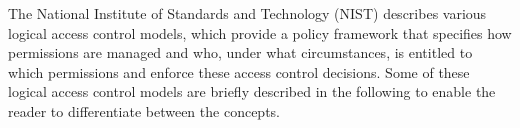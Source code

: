     The National Institute of Standards and Technology (NIST) \cite{Hu13guideto} describes various logical access control models, which provide a policy framework that specifies how permissions are managed and who, under what circumstances, is entitled to which permissions and enforce these access control decisions. Some of these logical access control models are briefly described in the following to enable the reader to differentiate between the concepts.
    \iffalse There is no consensus on the terms access control models, mechanisms and techniques. In this thesis an access control policy model describes a policy framework that specifies how permissions are managed and who, under what circumstances, is entitled to which permission on a high-level. There are different Access Control Policy Models which come with different advantages and disadvantages. Some of these models are briefly described in the following to enable the reader to differentiate between the concepts. \fi
